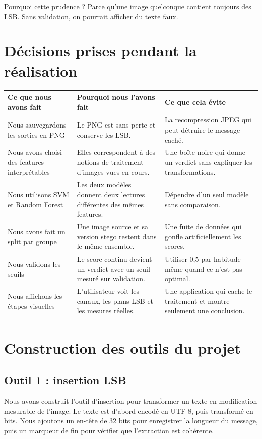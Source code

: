 \documentclass[11pt,a4paper]{article}
\begin{document}
Pourquoi cette prudence ? Parce qu'une image quelconque contient toujours des LSB. Sans validation, on pourrait afficher du texte faux.

\section{Décisions prises pendant la réalisation}
\begin{longtable}{p{4.1cm}p{5.0cm}p{5.0cm}}
\toprule
Ce que nous avons fait & Pourquoi nous l'avons fait & Ce que cela évite \\
\midrule
Nous sauvegardons les sorties en PNG & Le PNG est sans perte et conserve les LSB. & La recompression JPEG qui peut détruire le message caché. \\
Nous avons choisi des features interprétables & Elles correspondent à des notions de traitement d'images vues en cours. & Une boîte noire qui donne un verdict sans expliquer les transformations. \\
Nous utilisons SVM et Random Forest & Les deux modèles donnent deux lectures différentes des mêmes features. & Dépendre d'un seul modèle sans comparaison. \\
Nous avons fait un split par groupe & Une image source et sa version stego restent dans le même ensemble. & Une fuite de données qui gonfle artificiellement les scores. \\
Nous validons les seuils & Le score continu devient un verdict avec un seuil mesuré sur validation. & Utiliser 0,5 par habitude même quand ce n'est pas optimal. \\
Nous affichons les étapes visuelles & L'utilisateur voit les canaux, les plans LSB et les mesures réelles. & Une application qui cache le traitement et montre seulement une conclusion. \\
\bottomrule
\end{longtable}

\section{Construction des outils du projet}
\subsection*{Outil 1 : insertion LSB}
Nous avons construit l'outil d'insertion pour transformer un texte en modification mesurable de l'image. Le texte est d'abord encodé en UTF-8, puis transformé en bits. Nous ajoutons un en-tête de 32 bits pour enregistrer la longueur du message, puis un marqueur de fin pour vérifier que l'extraction est cohérente.
\end{document}
